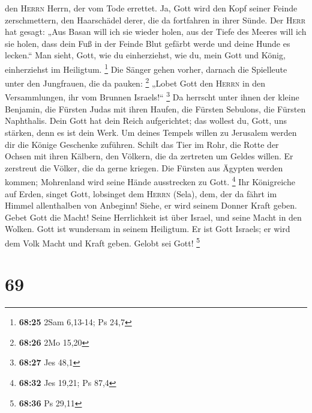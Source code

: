 den \textsc{Herrn} Herrn, der vom Tode errettet.  Ja,
Gott wird den Kopf seiner Feinde zerschmettern, den Haarschädel derer,
die da fortfahren in ihrer Sünde.  Der \textsc{Herr} hat
gesagt: „Aus Basan will ich sie wieder holen, aus der Tiefe des Meeres
will ich sie holen,  dass dein Fuß in der Feinde Blut
gefärbt werde und deine Hunde es lecken.``  Man sieht,
Gott, wie du einherziehst, wie du, mein Gott und König, einherziehst im
Heiligtum. \footnote{\textbf{68:25} 2Sam 6,13-14; Ps 24,7}
 Die Sänger gehen vorher, darnach die Spielleute unter
den Jungfrauen, die da pauken: \footnote{\textbf{68:26} 2Mo 15,20}
 „Lobet Gott den \textsc{Herrn} in den Versammlungen, ihr
vom Brunnen Israels!{}`` \footnote{\textbf{68:27} Jes 48,1}
 Da herrscht unter ihnen der kleine Benjamin, die Fürsten
Judas mit ihren Haufen, die Fürsten Sebulons, die Fürsten Naphthalis.
 Dein Gott hat dein Reich aufgerichtet; das wollest du,
Gott, uns stärken, denn es ist dein Werk.  Um deines
Tempels willen zu Jerusalem werden dir die Könige Geschenke zuführen.
 Schilt das Tier im Rohr, die Rotte der Ochsen mit ihren
Kälbern, den Völkern, die da zertreten um Geldes willen. Er zerstreut
die Völker, die da gerne kriegen.  Die Fürsten aus
Ägypten werden kommen; Mohrenland wird seine Hände ausstrecken zu Gott.
\footnote{\textbf{68:32} Jes 19,21; Ps 87,4}  Ihr
Königreiche auf Erden, singet Gott, lobsinget dem \textsc{Herrn} (Sela),
 dem, der da fährt im Himmel allenthalben von Anbeginn!
Siehe, er wird seinem Donner Kraft geben.  Gebet Gott die
Macht! Seine Herrlichkeit ist über Israel, und seine Macht in den
Wolken.  Gott ist wundersam in seinem Heiligtum. Er ist
Gott Israels; er wird dem Volk Macht und Kraft geben. Gelobt sei Gott!
\footnote{\textbf{68:36} Ps 29,11}

\hypertarget{section-26}{%
\section{69}\label{section-26}}

